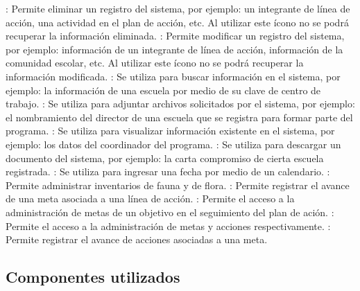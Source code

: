   \begin{UClist}
    \UCli \botKo: Permite eliminar un registro del sistema, por ejemplo: un integrante de línea de acción, una actividad en el plan de acción, etc. Al utilizar este ícono no se podrá recuperar la información eliminada. 
    \UCli \botEdit: Permite modificar un registro del sistema, por ejemplo: información de un integrante de línea de 		acción, información de la comunidad escolar, etc. Al utilizar este ícono no se podrá recuperar la información  			modificada.
    \UCli \botBus: Se utiliza para buscar información en el sistema, por ejemplo: la información de una escuela por medio de su clave de centro de trabajo.
    \UCli \botAddClip: Se utiliza para adjuntar archivos solicitados por el sistema, por ejemplo: el nombramiento del director de una escuela que se registra para formar parte del programa.
    \UCli \botV: Se utiliza para visualizar información existente en el sistema, por ejemplo: los datos del coordinador del programa.
    \UCli \botDescargar: Se utiliza para descargar un documento del sistema, por ejemplo: la carta compromiso de cierta escuela registrada.
    \UCli \botCalendar: Se utiliza para ingresar una fecha por medio de un calendario.
    \UCli \botReg: Permite administrar inventarios de fauna y de flora.
    \UCli \botMetas: Permite registrar el avance de una meta asociada a una línea de acción.
    \UCli \botAvanceObj: Permite el acceso a la administración de metas de un objetivo en el seguimiento del plan de ación.
    \UCli \botVer: Permite el acceso a la administración de metas y acciones respectivamente.
    \UCli \botAutoAjus: Permite registrar el avance de acciones asociadas a una meta.
    
  \end{UClist}


\subsection{Componentes utilizados}

